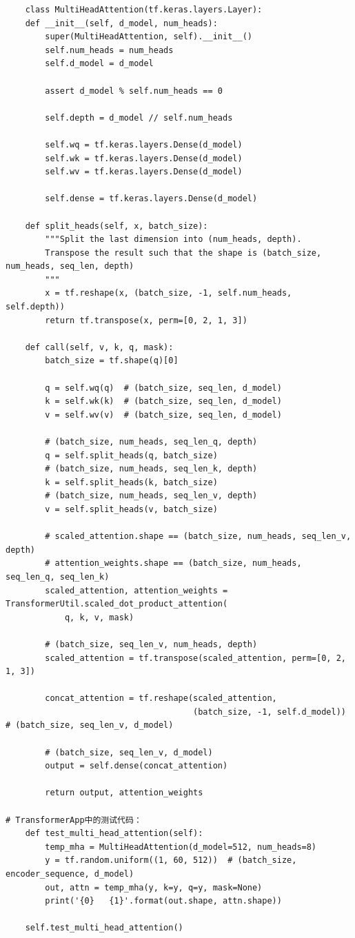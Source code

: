 \documentclass{article}
\begin{document}
\begin{lstlisting}
    class MultiHeadAttention(tf.keras.layers.Layer):
    def __init__(self, d_model, num_heads):
        super(MultiHeadAttention, self).__init__()
        self.num_heads = num_heads
        self.d_model = d_model

        assert d_model % self.num_heads == 0

        self.depth = d_model // self.num_heads

        self.wq = tf.keras.layers.Dense(d_model)
        self.wk = tf.keras.layers.Dense(d_model)
        self.wv = tf.keras.layers.Dense(d_model)

        self.dense = tf.keras.layers.Dense(d_model)

    def split_heads(self, x, batch_size):
        """Split the last dimension into (num_heads, depth).
        Transpose the result such that the shape is (batch_size, num_heads, seq_len, depth)
        """
        x = tf.reshape(x, (batch_size, -1, self.num_heads, self.depth))
        return tf.transpose(x, perm=[0, 2, 1, 3])

    def call(self, v, k, q, mask):
        batch_size = tf.shape(q)[0]

        q = self.wq(q)  # (batch_size, seq_len, d_model)
        k = self.wk(k)  # (batch_size, seq_len, d_model)
        v = self.wv(v)  # (batch_size, seq_len, d_model)

        # (batch_size, num_heads, seq_len_q, depth)
        q = self.split_heads(q, batch_size)
        # (batch_size, num_heads, seq_len_k, depth)
        k = self.split_heads(k, batch_size)
        # (batch_size, num_heads, seq_len_v, depth)
        v = self.split_heads(v, batch_size)

        # scaled_attention.shape == (batch_size, num_heads, seq_len_v, depth)
        # attention_weights.shape == (batch_size, num_heads, seq_len_q, seq_len_k)
        scaled_attention, attention_weights = TransformerUtil.scaled_dot_product_attention(
            q, k, v, mask)

        # (batch_size, seq_len_v, num_heads, depth)
        scaled_attention = tf.transpose(scaled_attention, perm=[0, 2, 1, 3])

        concat_attention = tf.reshape(scaled_attention,
                                      (batch_size, -1, self.d_model))  # (batch_size, seq_len_v, d_model)

        # (batch_size, seq_len_v, d_model)
        output = self.dense(concat_attention)

        return output, attention_weights

# TransformerApp中的测试代码：
    def test_multi_head_attention(self):
        temp_mha = MultiHeadAttention(d_model=512, num_heads=8)
        y = tf.random.uniform((1, 60, 512))  # (batch_size, encoder_sequence, d_model)
        out, attn = temp_mha(y, k=y, q=y, mask=None)
        print('{0}   {1}'.format(out.shape, attn.shape))

    self.test_multi_head_attention()
\end{lstlisting}
\end{document}
